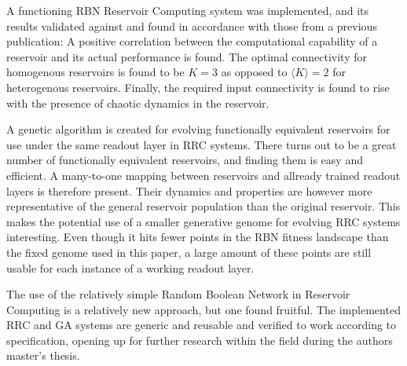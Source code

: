 A functioning RBN Reservoir Computing system was implemented,
and its results validated against and found in accordance with those from a previous publication:
A positive correlation between the computational capability of a reservoir and its actual performance is found.
The optimal connectivity for homogenous reservoirs is found to be $K=3$ as opposed to $\langle K \rangle = 2$ for heterogenous reservoirs.
Finally, the required input connectivity is found to rise with the presence of chaotic dynamics in the reservoir.

A genetic algorithm is created for evolving functionally equivalent reservoirs for use under the same readout layer in RRC systems.
There turns out to be a great number of functionally equivalent reservoirs, and finding them is easy and efficient.
A many-to-one mapping between reservoirs and allready trained readout layers is therefore present.
Their dynamics and properties are however more representative of the general reservoir population than the original reservoir.
This makes the potential use of a smaller generative genome for evolving RRC systems interesting.
Even though it hits fewer points in the RBN fitness landscape than the fixed genome used in this paper,
a large amount of these points are still usable for each instance of a working readout layer.

The use of the relatively simple Random Boolean Network in Reservoir Computing is a relatively new approach,
but one found fruitful.
The implemented RRC and GA systems are generic and reusable and verified to work according to specification,
opening up for further research within the field during the authors master's thesis.
